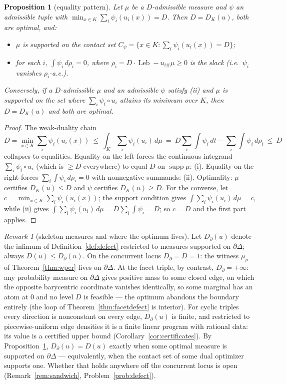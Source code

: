 \documentclass[11pt,reqno]{amsart}
\theoremstyle{plain}
\newtheorem{proposition}[theorem]{Proposition}
\theoremstyle{definition}
\theoremstyle{remark}
\newtheorem{remark}[theorem]{Remark}
\newcommand{\Leb}{\operatorname{Leb}}
\begin{document}
\begin{proposition}[equality pattern]\label{prop:slack}
Let $\mu$ be a $D$-admissible measure and $\psi$ an admissible tuple with
$\min_{x\in K}\sum_i\psi_i(u_i(x))=D$. Then $D=D_K(u)$, both are optimal,
and:
\begin{itemize}
\item[(i)] $\mu$ is supported on the \emph{contact set}
$C_\psi=\bigl\{x\in K:\sum_i\psi_i(u_i(x))=D\bigr\}$;
\item[(ii)] for each $i$, $\int\psi_i\,d\rho_i=0$, where
$\rho_i=D\cdot\Leb-u_{i\#}\mu\ge0$ is the slack (i.e.\ $\psi_i$ vanishes
$\rho_i$-a.e.).
\end{itemize}
Conversely, if a $D$-admissible $\mu$ and an admissible
$\psi$ satisfy (ii) and $\mu$ is supported on the set where
$\sum_i\psi_i\circ u_i$ attains its minimum over $K$, then
$D=D_K(u)$ and both are optimal.
\end{proposition}

\begin{proof}
The weak-duality chain
\[
D=\min_{x\in K}\sum_i\psi_i(u_i(x))\ \le\ \int_K\sum_i\psi_i(u_i)\,d\mu
\ =\ D\sum_i\int\psi_i\,dt-\sum_i\int\psi_i\,d\rho_i\ \le\ D
\]
collapses to equalities. Equality on the left forces the continuous integrand
$\sum_i\psi_i\circ u_i$ (which is $\ge D$ everywhere) to equal $D$ on
$\operatorname{supp}\mu$: (i). Equality on the right forces
$\sum_i\int\psi_i\,d\rho_i=0$ with nonnegative summands: (ii). Optimality:
$\mu$ certifies $D_K(u)\le D$ and $\psi$ certifies $D_K(u)\ge D$. For the
converse, let $c=\min_{x\in K}\sum_i\psi_i(u_i(x))$; the support condition
gives $\int\sum_i\psi_i(u_i)\,d\mu=c$, while (ii) gives
$\int\sum_i\psi_i(u_i)\,d\mu=D\sum_i\int\psi_i=D$; so $c=D$ and the first
part applies.
\end{proof}

\begin{remark}[skeleton measures and where the optimum lives]
\label{rem:skeleton}
Let $D_\partial(u)$ denote the infimum of Definition~\ref{def:defect}
restricted to measures supported on $\partial\Delta$; always
$D(u)\le D_\partial(u)$. On the concurrent locus
$D_\partial=D=1$: the witness $\mu_p$ of Theorem~\ref{thm:wper} lives on
$\partial\Delta$. At the facet triple, by contrast, $D_\partial=+\infty$:
any probability measure on $\partial\Delta$ gives positive mass to some
closed edge, on which the opposite barycentric coordinate vanishes
identically, so some marginal has an atom at $0$ and no level $D$ is
feasible --- the optimum abandons the boundary entirely (the loop of
Theorem~\ref{thm:facetdefect} is interior). For cyclic triples every
direction is nonconstant on every edge, $D_\partial(u)$ is finite, and
restricted to piecewise-uniform edge densities it is a finite linear program
with rational data: its value is a certified upper bound
(Corollary~\ref{cor:certificates}). By Proposition~\ref{prop:slack},
$D_\partial(u)=D(u)$ exactly when some optimal measure is supported on
$\partial\Delta$ --- equivalently, when the contact set of some dual
optimizer supports one. Whether that holds anywhere off the concurrent locus
is open (Remark~\ref{rem:sandwich}, Problem~\ref{prob:defect}).
\end{remark}
\end{document}
